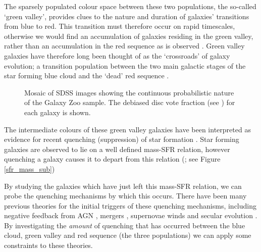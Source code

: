 \documentclass[useAMS,usenatbib]{mn2e}
\def\changed    {\color{titlecol} }
\begin{document}
The sparsely populated colour space between these two populations, the so-called `green valley', provides clues to the nature and duration of galaxies' transitions from blue to red. This transition must therefore occur on rapid timescales, otherwise we would find an accumulation of galaxies residing in the green valley, rather than an accumulation in the red sequence as is observed \citep{Arnouts07, Martin07}. Green valley galaxies have therefore long been thought of as the `crossroads' of galaxy evolution; a transition population between the two main galactic stages of the star forming blue cloud and the `dead' red sequence \citep{Bell04, Wyder07, Schim07, Martin07, Faber07, Mendez11, Gonc12, Sch2014}. 

\begin{figure}
\caption{{\changed Mosaic of SDSS images showing the continuous probabilistic nature of the Galaxy Zoo sample. The debiased disc vote fraction (see \citealt{GZ2}) for each galaxy is shown.}}
\label{mosaic}
\end{figure}

The intermediate colours of these green valley galaxies have been interpreted as evidence for recent quenching (suppression) of star formation \citep{Salim07}. Star forming galaxies are observed to lie on a well defined mass-SFR relation, however quenching a galaxy causes it to depart from this relation (\citealt{Noeske07, Peng}; see Figure \ref{sfr_mass_sub})



By studying the galaxies which  have just left this mass-SFR relation, we can probe the quenching mechanisms by which this occurs. There have been many previous theories for the initial triggers of these quenching mechanisms, including negative feedback from AGN \citep{Sch07}, mergers \citep{Darg10a}, supernovae winds \citep{MFB12} and secular evolution \citep{Masters10, Masters11}. By investigating the \emph{amount} of quenching that has occurred between the blue cloud, green valley and red sequence (the three populations) we can apply some constraints to these theories. 
\end{document}
